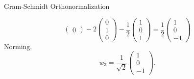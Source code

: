 \documentclass[smaller,hyperref={CJKbookmarks=true}]{beamer}
\begin{document}
\begin{frame}{Gram-Schmidt Orthonormalization}
\begin{spacing}{0.9}
\[\begin{pmatrix}
                                            0
                                          \end{pmatrix}-2\begin{pmatrix}
                                                           0 \\
                                                           1 \\
                                                           0
                                                         \end{pmatrix}-\frac{1}{2}\begin{pmatrix}
                                                                                    1 \\
                                                                                    0 \\
                                                                                    1
                                                                                  \end{pmatrix}=\frac{1}{2}\begin{pmatrix}
                                                                                                             1 \\
                                                                                                             0 \\
                                                                                                             -1
                                                                                                           \end{pmatrix}\]
Norming,
\[w_3=\frac{1}{\sqrt{2}}\begin{pmatrix}
                          1 \\
                          0 \\
                          -1
                        \end{pmatrix}.\]
\end{spacing}
\end{frame}
\end{document}
